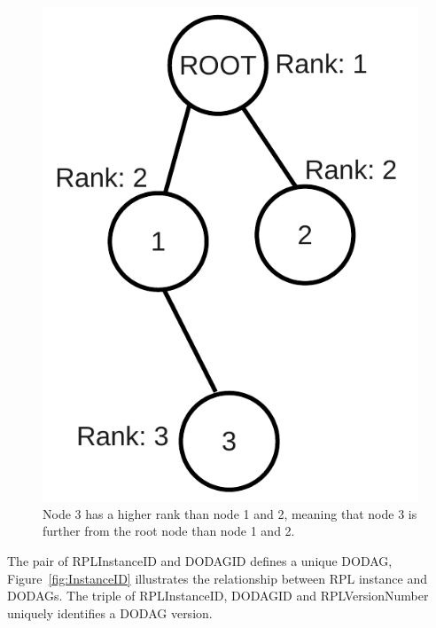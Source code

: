 \begin{figure}[htbp]
  \begin{center}
    \leavevmode
      \includegraphics[scale=0.35]{Pics/Rank.pdf}
    \caption{Node 3 has a higher rank than node 1 and 2, meaning that node 3 is further from the root node than node 1 and 2.}
    \label{fig:Rank}
  \end{center}
\end{figure}

The pair of RPLInstanceID and DODAGID defines a unique DODAG, Figure~\ref{fig:InstanceID} illustrates the relationship between RPL instance and DODAGs. 
The triple of RPLInstanceID, DODAGID and RPLVersionNumber uniquely identifies a DODAG version.

